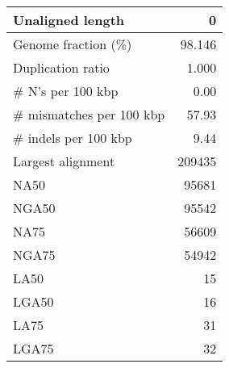 \documentclass[12pt,a4paper]{article}
\begin{document}
\begin{table}[ht]
\begin{center}
\begin{tabular}{|l*{1}{|r}|}
Unaligned length & 0 \\ \hline
Genome fraction (\%) & 98.146 \\ \hline
Duplication ratio & 1.000 \\ \hline
\# N's per 100 kbp & 0.00 \\ \hline
\# mismatches per 100 kbp & 57.93 \\ \hline
\# indels per 100 kbp & 9.44 \\ \hline
Largest alignment & 209435 \\ \hline
NA50 & 95681 \\ \hline
NGA50 & 95542 \\ \hline
NA75 & 56609 \\ \hline
NGA75 & 54942 \\ \hline
LA50 & 15 \\ \hline
LGA50 & 16 \\ \hline
LA75 & 31 \\ \hline
LGA75 & 32 \\ \hline
\end{tabular}
\end{center}
\end{table}
\end{document}
